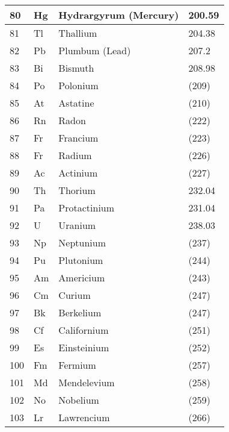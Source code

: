 \documentclass{article}
\begin{document}
\begin{center}
\begin{longtable}{|l|l|l|l|}
 \hline
    80 & Hg & \cellcolor{transred}Hydrargyrum (Mercury) & 200.59\\
 \hline
    81 & Tl & \cellcolor{postblue}Thallium & 204.38\\
 \hline
    82 & Pb & \cellcolor{postblue}Plumbum (Lead) & 207.2\\
 \hline
    83 & Bi & \cellcolor{postblue}Bismuth & 208.98\\
 \hline
    84 & Po & \cellcolor{postblue}Polonium & (209)\\
 \hline
    85 & At & \cellcolor{metalloid}Astatine & (210)\\
 \hline
    86 & Rn & \cellcolor{noblepink}Radon & (222)\\
 \hline
 \hline
    87 & Fr & \cellcolor{alkalibeige}Francium & (223)\\
 \hline
    88 & Fr & \cellcolor{alkalineyellow}Radium & (226)\\
 \hline
    89 & Ac & \cellcolor{actipink}Actinium & (227)\\
 \hline
    90 & Th & \cellcolor{actipink}Thorium & 232.04\\
 \hline
    91 & Pa & \cellcolor{actipink}Protactinium & 231.04\\
 \hline
    92 & U & \cellcolor{actipink}Uranium & 238.03\\
 \hline
    93 & Np & \cellcolor{actipink}Neptunium & (237)\\
 \hline
    94 & Pu & \cellcolor{actipink}Plutonium & (244)\\
 \hline
    95 & Am & \cellcolor{actipink}Americium & (243)\\
 \hline
    96 & Cm & \cellcolor{actipink}Curium & (247)\\
 \hline
    97 & Bk & \cellcolor{actipink}Berkelium & (247)\\
 \hline
    98 & Cf & \cellcolor{actipink}Californium & (251)\\
 \hline
    99 & Es & \cellcolor{actipink}Einsteinium & (252)\\
 \hline
    100 & Fm & \cellcolor{actipink}Fermium & (257)\\
 \hline
    101 & Md & \cellcolor{actipink}Mendelevium & (258)\\
 \hline
    102 & No & \cellcolor{actipink}Nobelium & (259)\\
 \hline
    103 & Lr & \cellcolor{actipink}Lawrencium & (266)\\
 \hline
\end{longtable}
\end{center}
\end{document}

